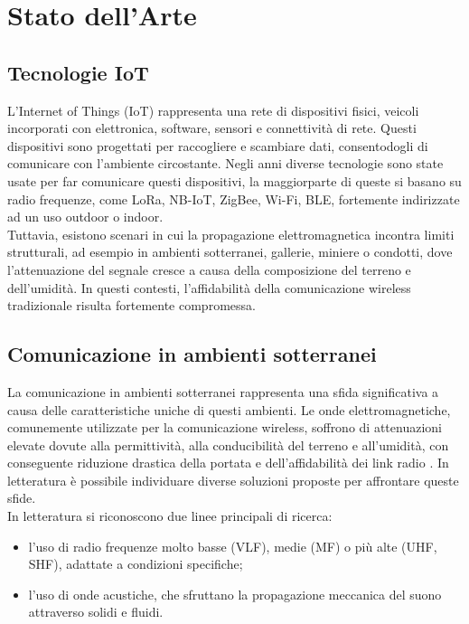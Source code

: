 \chapter{Stato dell'Arte}
\label{chap:stato_arte}

\section{Tecnologie IoT}
L'Internet of Things (IoT) rappresenta una rete di dispositivi fisici, veicoli incorporati con elettronica, software, sensori e connettività di rete.
Questi dispositivi sono progettati per raccogliere e scambiare dati, consentodogli di comunicare con l'ambiente circostante.
Negli anni diverse tecnologie sono state usate per far comunicare questi dispositivi, la maggiorparte di queste si basano su radio frequenze, 
come LoRa, NB-IoT, ZigBee, Wi-Fi, BLE, fortemente indirizzate ad un uso outdoor o indoor. \\

Tuttavia, esistono scenari in cui la propagazione elettromagnetica incontra limiti
strutturali, ad esempio in ambienti sotterranei, gallerie, miniere o condotti, dove
l'attenuazione del segnale cresce a causa della composizione del terreno e
dell'umidità. In questi contesti, l'affidabilità della comunicazione wireless
tradizionale risulta fortemente compromessa.

\section{Comunicazione in ambienti sotterranei}
La comunicazione in ambienti sotterranei rappresenta una sfida significativa a causa delle caratteristiche uniche di questi ambienti.
Le onde elettromagnetiche, comunemente utilizzate per la comunicazione wireless, soffrono di attenuazioni elevate dovute alla permittività, alla conducibilità del terreno e all'umidità, con conseguente riduzione drastica della portata e dell'affidabilità dei link radio \cite{akyildiz2006}.
In letteratura è possibile individuare diverse soluzioni proposte per affrontare queste sfide.\\
In letteratura si riconoscono due linee principali di ricerca:
\begin{itemize}
    \item l'uso di radio frequenze molto basse (VLF), medie (MF)
          o più alte (UHF, SHF), adattate a condizioni specifiche;
    \item l'uso di onde acustiche, che sfruttano la propagazione meccanica del suono
          attraverso solidi e fluidi.
\end{itemize}
